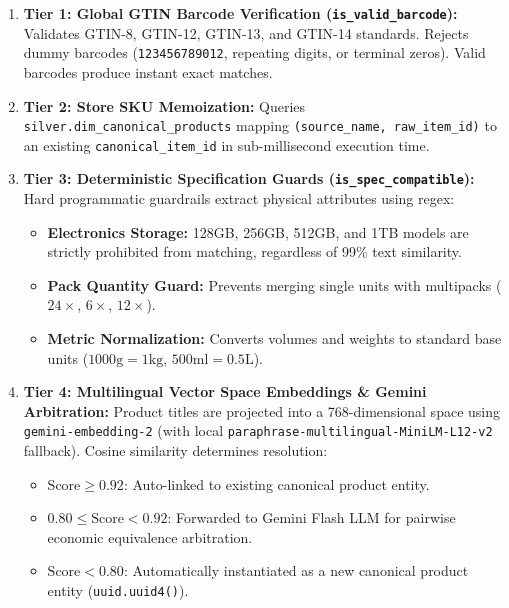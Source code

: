 \documentclass[11pt,a4paper,oneside]{article}
\begin{document}
\begin{enumerate}
    \item \textbf{Tier 1: Global GTIN Barcode Verification (\texttt{is\_valid\_barcode}):}
        Validates GTIN-8, GTIN-12, GTIN-13, and GTIN-14 standards. Rejects dummy barcodes (\texttt{123456789012}, repeating digits, or terminal zeros). Valid barcodes produce instant exact matches.
    \item \textbf{Tier 2: Store SKU Memoization:}
        Queries \texttt{silver.dim\_canonical\_products} mapping \texttt{(source\_name, raw\_item\_id)} to an existing \texttt{canonical\_item\_id} in sub-millisecond execution time.
    \item \textbf{Tier 3: Deterministic Specification Guards (\texttt{is\_spec\_compatible}):}
        Hard programmatic guardrails extract physical attributes using regex:
        \begin{itemize}[noitemsep]
            \item \textbf{Electronics Storage:} 128GB, 256GB, 512GB, and 1TB models are strictly prohibited from matching, regardless of 99\% text similarity.
            \item \textbf{Pack Quantity Guard:} Prevents merging single units with multipacks ($24\times$, $6\times$, $12\times$).
            \item \textbf{Metric Normalization:} Converts volumes and weights to standard base units ($1000\text{g} = 1\text{kg}$, $500\text{ml} = 0.5\text{L}$).
        \end{itemize}
    \item \textbf{Tier 4: Multilingual Vector Space Embeddings \& Gemini Arbitration:}
        Product titles are projected into a 768-dimensional space using \texttt{gemini-embedding-2} (with local \texttt{paraphrase-multilingual-MiniLM-L12-v2} fallback). Cosine similarity determines resolution:
        \begin{itemize}[noitemsep]
            \item $\text{Score} \ge 0.92$: Auto-linked to existing canonical product entity.
            \item $0.80 \le \text{Score} < 0.92$: Forwarded to Gemini Flash LLM for pairwise economic equivalence arbitration.
            \item $\text{Score} < 0.80$: Automatically instantiated as a new canonical product entity (\texttt{uuid.uuid4()}).
        \end{itemize}
\end{enumerate}
\end{document}
